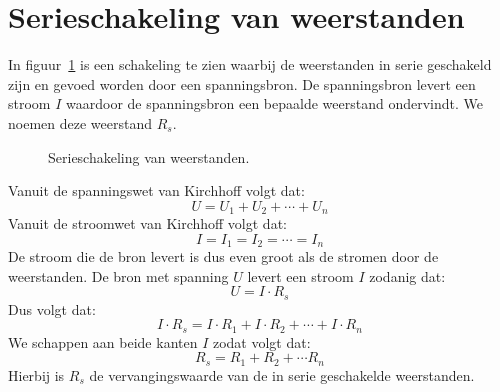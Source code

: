 \section{Serieschakeling van weerstanden}
In figuur~\ref{fig:gelserieschakelingweerstanden} is een schakeling te zien waarbij de weerstanden
in serie geschakeld zijn en gevoed worden door een spanningsbron. De spanningsbron levert een stroom
$I$ waardoor de spanningsbron een bepaalde weerstand ondervindt. We noemen deze weerstand $R_s$.

\begin{figure}[!ht]
\centering
{}
\caption{Serieschakeling van weerstanden.}
\label{fig:gelserieschakelingweerstanden}
\end{figure}

Vanuit de spanningswet van Kirchhoff volgt dat:
%
\begin{equation}
U=U_1+U_2+\cdots+U_n
\end{equation}
%
Vanuit de stroomwet van Kirchhoff volgt dat:
%
\begin{equation}
I = I_1 = I_2 = \cdots = I_n
\end{equation}
%
De stroom die de bron levert is dus even groot als de stromen door de weerstanden.
De bron met spanning $U$ levert een stroom $I$ zodanig dat:
%
\begin{equation}
U=I\cdot R_s
\end{equation}
%
Dus volgt dat:
%
\begin{equation}
I\cdot R_s = I\cdot R_1+I\cdot R_2+\cdots+I\cdot R_n
\end{equation}
%
We schappen aan beide kanten $I$ zodat volgt dat:
%
\begin{equation}
R_s = R_1 + R_2 + \cdots R_n
\end{equation}
%
Hierbij is $R_s$ de vervangingswaarde van de in serie geschakelde weerstanden.


